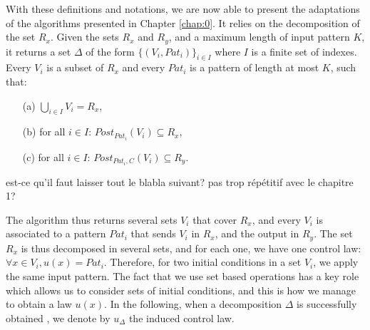 With these definitions and notations, we are now able to present the adaptations of 
the algorithms presented in Chapter \ref{chap:0}. It relies on the decomposition
of the set $R_x$.  Given the sets $R_x$ and $R_y$, and a maximum length of 
input pattern $K$, it returns a set $\Delta$ 
of the form $\{(V_i,Pat_i)\}_{i\in I}$ where $I$ is a finite set of indexes. Every $V_i$
is a subset of $R_x$ and every $Pat_i$ is a pattern of length at most $K$, such that:
\begin{itemize}
\item[(a)] $\bigcup_{i \in I}V_i = R_x$,
\item[(b)] for all $i \in I$: $Post_{Pat_i}(V_i) \subseteq R_x$,
\item[(c)] for all $i \in I$: $Post_{Pat_i,C}(V_i) \subseteq R_y$.
\end{itemize}
{\todo est-ce qu'il faut laisser tout le  blabla suivant? pas trop r\'ep\'etitif avec le chapitre 1?} 

The algorithm thus returns several sets $V_i$ that cover $R_x$, and 
every $V_i$ is associated to a pattern $Pat_i$ that sends $V_i$ in $R_x$, and the output in $R_y$.
The set $R_x$ is thus decomposed in several sets, and for each one, we have 
one control law: $\forall x \in V_i, u(x) = Pat_i$. Therefore, for two 
initial conditions in a set $V_i$, we apply the same input pattern.
The fact that we use set based operations has a key role which allows us to consider 
sets of initial conditions, and this is how we manage to obtain
a law $u(x)$. In the following, when a decomposition $\Delta$ is successfully obtained , we denote
by $u_{\Delta}$ the induced control law.


